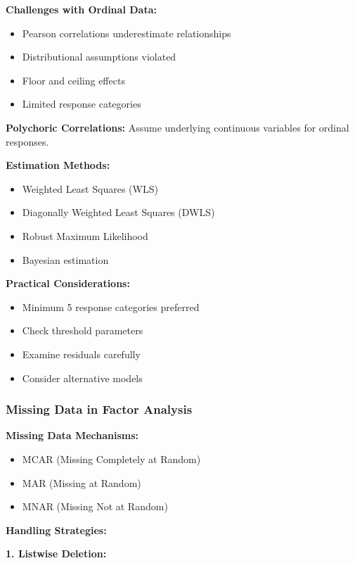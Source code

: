\documentclass[
]{article}
\begin{document}
\textbf{Challenges with Ordinal Data:}

\begin{itemize}
\item
  Pearson correlations underestimate relationships
\item
  Distributional assumptions violated
\item
  Floor and ceiling effects
\item
  Limited response categories
\end{itemize}

\textbf{Polychoric Correlations:} Assume underlying continuous variables
for ordinal responses.

\textbf{Estimation Methods:}

\begin{itemize}
\item
  Weighted Least Squares (WLS)
\item
  Diagonally Weighted Least Squares (DWLS)
\item
  Robust Maximum Likelihood
\item
  Bayesian estimation
\end{itemize}

\textbf{Practical Considerations:}

\begin{itemize}
\item
  Minimum 5 response categories preferred
\item
  Check threshold parameters
\item
  Examine residuals carefully
\item
  Consider alternative models
\end{itemize}

\subsubsection{Missing Data in Factor Analysis}

\textbf{Missing Data Mechanisms:}

\begin{itemize}
\item
  MCAR (Missing Completely at Random)
\item
  MAR (Missing at Random)
\item
  MNAR (Missing Not at Random)
\end{itemize}

\textbf{Handling Strategies:}

\textbf{1. Listwise Deletion:}
\end{document}

